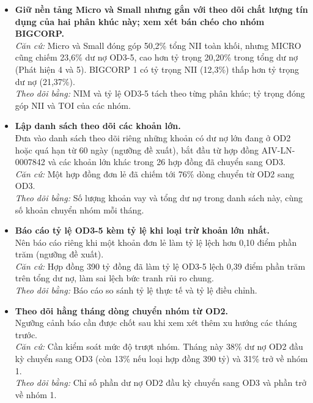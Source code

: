 \documentclass[12pt]{eDA_conquer2026}
\begin{document}
\begin{itemize}[label=--, leftmargin=0.8cm]
    
    \item \textbf{Giữ nền tảng Micro và Small nhưng gắn với theo dõi chất lượng tín dụng của hai phân khúc này; xem xét bán chéo cho nhóm BIGCORP.}\\
    \textit{Căn cứ:} Micro và Small đóng góp 50,2\% tổng NII toàn khối, nhưng MICRO cũng chiếm 23,6\% dư nợ OD3-5, cao hơn tỷ trọng 20,20\% trong tổng dư nợ (Phát hiện 4 và 5). BIGCORP 1 có tỷ trọng NII (12,3\%) thấp hơn tỷ trọng dư nợ (21,37\%).\\
    \textit{Theo dõi bằng:} NIM và tỷ lệ OD3-5 tách theo từng phân khúc; tỷ trọng đóng góp NII và TOI của các nhóm.

    \item \textbf{Lập danh sách theo dõi các khoản lớn.}\\
    Đưa vào danh sách theo dõi riêng những khoản có dư nợ lớn đang ở OD2 hoặc quá hạn từ 60 ngày (ngưỡng đề xuất), bắt đầu từ hợp đồng AIV-LN-0007842 và các khoản lớn khác trong 26 hợp đồng đã chuyển sang OD3.\\
    \textit{Căn cứ:} Một hợp đồng đơn lẻ đã chiếm tới 76\% dòng chuyển từ OD2 sang OD3.\\
    \textit{Theo dõi bằng:} Số lượng khoản vay và tổng dư nợ trong danh sách này, cùng số khoản chuyển nhóm mỗi tháng.

    \item \textbf{Báo cáo tỷ lệ OD3-5 kèm tỷ lệ khi loại trừ khoản lớn nhất.}\\
    Nên báo cáo riêng khi một khoản đơn lẻ làm tỷ lệ lệch hơn 0,10 điểm phần trăm (ngưỡng đề xuất).\\
    \textit{Căn cứ:} Hợp đồng 390 tỷ đồng đã làm tỷ lệ OD3-5 lệch 0,39 điểm phần trăm trên tổng dư nợ, làm sai lệch bức tranh rủi ro chung.\\
    \textit{Theo dõi bằng:} Báo cáo so sánh tỷ lệ thực tế và tỷ lệ điều chỉnh.
    
    \item \textbf{Theo dõi hằng tháng dòng chuyển nhóm từ OD2.}\\
    Ngưỡng cảnh báo cần được chốt sau khi xem xét thêm xu hướng các tháng trước.\\
    \textit{Căn cứ:} Cần kiểm soát mức độ trượt nhóm. Tháng này 38\% dư nợ OD2 đầu kỳ chuyển sang OD3 (còn 13\% nếu loại hợp đồng 390 tỷ) và 31\% trở về nhóm 1.\\
    \textit{Theo dõi bằng:} Chỉ số phần dư nợ OD2 đầu kỳ chuyển sang OD3 và phần trở về nhóm 1.

\end{itemize}
\end{document}
